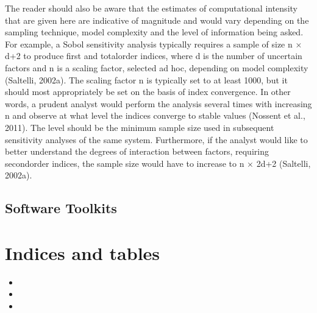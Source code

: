 \documentclass[letterpaper,10pt,english]{sphinxmanual}
\begin{document}
\sphinxAtStartPar
The reader should also be aware that the estimates of computational intensity that are given here are indicative of magnitude and would vary depending on the sampling technique, model complexity and the level of information being asked. For example, a Sobol sensitivity analysis typically requires a sample of size n × d+2 to produce first\sphinxhyphen{} and total\sphinxhyphen{}order indices, where d is the number of uncertain factors and n is a scaling factor, selected ad hoc, depending on model complexity (Saltelli, 2002a). The scaling factor n is typically set to at least 1000, but it should most appropriately be set on the basis of index convergence. In other words, a prudent analyst would perform the analysis several times with increasing n and observe at what level the indices converge to stable values (Nossent et al., 2011). The level should be the minimum sample size used in subsequent sensitivity analyses of the same system. Furthermore, if the analyst would like to better understand the degrees of interaction between factors, requiring second\sphinxhyphen{}order indices, the sample size would have to increase to n × 2d+2 (Saltelli, 2002a).


\section{Software Toolkits}
\label{\detokenize{3_sensitivity_analysis_the_basics:software-toolkits}}

\chapter{Indices and tables}
\label{\detokenize{index:indices-and-tables}}\begin{itemize}
\item {} 
\sphinxAtStartPar
{}

\item {} 
\sphinxAtStartPar
{}

\item {} 
\sphinxAtStartPar
{}

\end{itemize}



\renewcommand{\indexname}{Index}
\printindex
\end{document}
